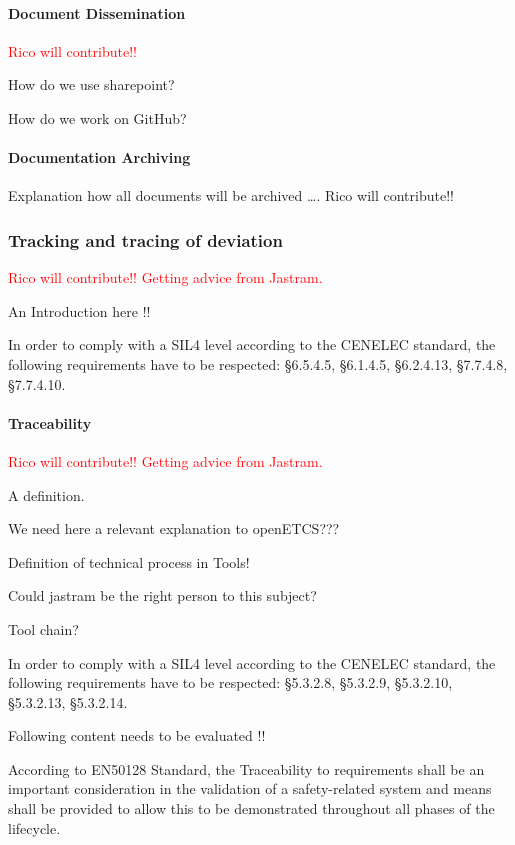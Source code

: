\documentclass{template/openetcs_article}
\begin{document}
\paragraph{Document Dissemination }
\textcolor{red}{Rico will contribute!!}

How do we use sharepoint?

How do we work on GitHub?

\paragraph{Documentation Archiving}
Explanation how all documents will be archived {\dots}. Rico will contribute!!


\subsubsection{Tracking and tracing of deviation}
\textcolor{red}{Rico will contribute!! Getting advice from Jastram.}

An Introduction here !!

In order to comply with a SIL4 level according to the CENELEC standard, the following requirements have to be respected: {\S}6.5.4.5, {\S}6.1.4.5, {\S}6.2.4.13, {\S}7.7.4.8, {\S}7.7.4.10.


\paragraph{Traceability}
\textcolor{red}{Rico will contribute!! Getting advice from Jastram.}

A definition. 

We need here a relevant explanation to openETCS???

Definition of technical process in Tools! 

Could jastram be the right person to this subject?

Tool chain?

In order to comply with a SIL4 level according to the CENELEC standard, the following requirements have to be respected: {\S}5.3.2.8, {\S}5.3.2.9, {\S}5.3.2.10, {\S}5.3.2.13, {\S}5.3.2.14.

Following content needs to be evaluated !!

According to EN50128 Standard, the Traceability to requirements shall be an important consideration in the validation of a safety-related system and means shall be provided to allow this to be demonstrated throughout all phases of the lifecycle.
\end{document}
